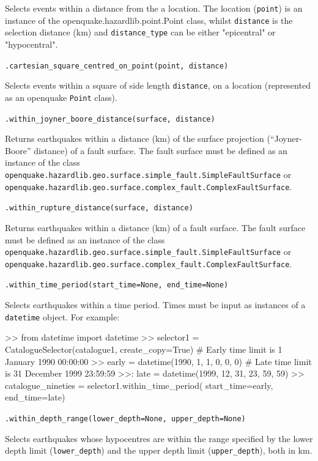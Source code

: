 Selects events within a distance from the a location. The location (\verb=point=) is an instance of the openquake.hazardlib.point.Point class, whilst \verb=distance= is the selection distance (km) and \verb=distance_type= can be either "epicentral" or "hypocentral".  

\verb;.cartesian_square_centred_on_point(point, distance);

Selects events within a square of side length \verb=distance=, on a location (represented as an openquake \verb=Point= class).

\verb;.within_joyner_boore_distance(surface, distance);

Returns earthquakes within a distance (km) of the surface projection (``Joyner-Boore'' distance) of a fault surface. The fault surface must be defined as an instance of the class \\\verb=openquake.hazardlib.geo.surface.simple_fault.SimpleFaultSurface= or\\ \verb=openquake.hazardlib.geo.surface.complex_fault.ComplexFaultSurface=.

\verb;.within_rupture_distance(surface, distance);

Returns earthquakes within a distance (km) of a fault surface. The fault surface must be defined as an instance of the class \\\verb=openquake.hazardlib.geo.surface.simple_fault.SimpleFaultSurface= or\\ \verb=openquake.hazardlib.geo.surface.complex_fault.ComplexFaultSurface=.

\verb;.within_time_period(start_time=None, end_time=None);

Selects earthquakes within a time period. Times must be input as instances of a \verb=datetime= object. For example:

\begin{python}[frame=single]
>> from datetime import datetime
>> selector1 = CatalogueSelector(catalogue1, create_copy=True)
# Early time limit is 1 January 1990 00:00:00
>> early = datetime(1990, 1, 1, 0, 0, 0)
# Late time limit is 31 December 1999 23:59:59
>>: late = datetime(1999, 12, 31, 23, 59, 59)
>> catalogue_nineties = selector1.within_time_period(
    start_time=early,
    end_time=late)
\end{python}

\verb;.within_depth_range(lower_depth=None, upper_depth=None);

Selects earthquakes whose hypocentres are within the range specified by the lower depth limit (\verb=lower_depth=) and the upper depth limit (\verb=upper_depth=), both in km.

